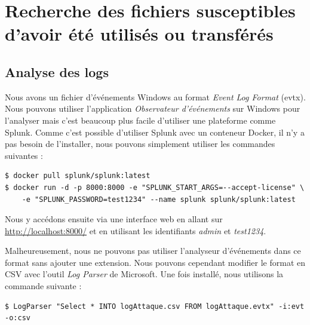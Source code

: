 \documentclass[a4paper]{article}
\begin{document}















\section{Recherche des fichiers susceptibles d'avoir été utilisés ou transférés}





\subsection{Analyse des logs}

Nous avons un fichier d'événements Windows au format \textit{Event Log Format} (evtx). Nous pouvons utiliser l'application \textit{Observateur d'événements} sur Windows pour l'analyser mais c'est beaucoup plus facile d'utiliser une plateforme comme Splunk. Comme c'est possible d'utiliser Splunk avec un conteneur Docker, il n'y a pas besoin de l'installer, nous pouvons simplement utiliser les commandes suivantes :
\begin{example}
\begin{Verbatim}[fontsize=\small]
$ docker pull splunk/splunk:latest
$ docker run -d -p 8000:8000 -e "SPLUNK_START_ARGS=--accept-license" \
    -e "SPLUNK_PASSWORD=test1234" --name splunk splunk/splunk:latest
\end{Verbatim}
\end{example}
Nous y accédons ensuite via une interface web en allant sur {\small \url{http://localhost:8000/}} et en utilisant les identifiants \textit{admin} et \textit{test1234}.

Malheureusement, nous ne pouvons pas utiliser l'analyseur d'événements dans ce format sans ajouter une extension. Nous pouvons cependant modifier le format en CSV avec l'outil \textit{Log Parser} \cite{1} de Microsoft. Une fois installé, nous utilisons la commande suivante :
\begin{example}
\begin{Verbatim}[fontsize=\small]
$ LogParser "Select * INTO logAttaque.csv FROM logAttaque.evtx" -i:evt -o:csv
\end{Verbatim}
\end{example}
\end{document}
